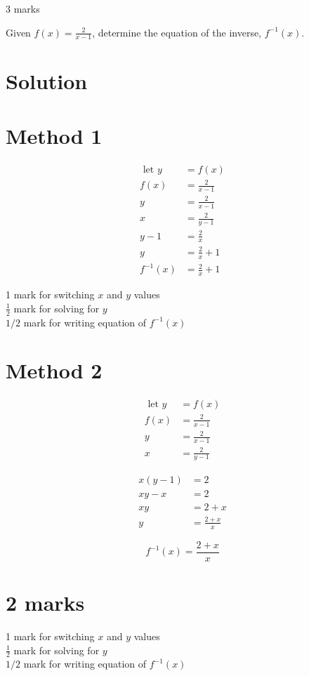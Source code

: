 \documentclass[10pt]{article}
\begin{document}
3 marks

Given $f(x)=\frac{2}{x-1}$, determine the equation of the inverse, $f^{-1}(x)$.

\section*{Solution}
\section*{Method 1}
$$
\begin{aligned}
\text { let } y & =f(x) \\
f(x) & =\frac{2}{x-1} \\
y & =\frac{2}{x-1} \\
x & =\frac{2}{y-1} \\
y-1 & =\frac{2}{x} \\
y & =\frac{2}{x}+1 \\
f^{-1}(x) & =\frac{2}{x}+1
\end{aligned}
$$

1 mark for switching $x$ and $y$ values\\
$\frac{1}{2}$ mark for solving for $y$\\
$1 / 2$ mark for writing equation of $f^{-1}(x)$

\section*{Method 2}
$$
\begin{aligned}
\text { let } y & =f(x) \\
f(x) & =\frac{2}{x-1} \\
y & =\frac{2}{x-1} \\
x & =\frac{2}{y-1}
\end{aligned}
$$

$$
\begin{aligned}
x(y-1) & =2 \\
x y-x & =2 \\
x y & =2+x \\
y & =\frac{2+x}{x}
\end{aligned}
$$

$$
f^{-1}(x)=\frac{2+x}{x}
$$

\section*{2 marks}
1 mark for switching $x$ and $y$ values\\
$\frac{1}{2}$ mark for solving for $y$\\
$1 / 2$ mark for writing equation of $f^{-1}(x)$
\end{document}
